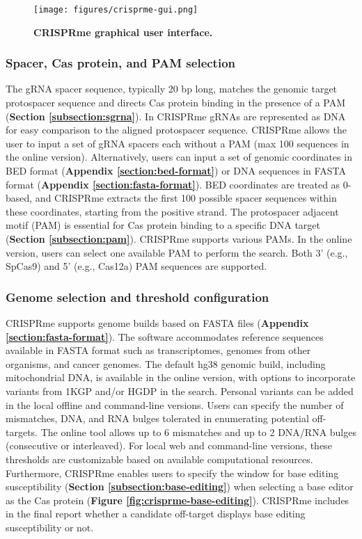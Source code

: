 \documentclass[a4paper, titlepage, openright]{book}
\newcommand{\crisprme}{CRISPRme\xspace}
\begin{document}
\begin{figure}[!]
	\centering
	\texttt{[image: figures/crisprme-gui.png]}
	\caption[\crisprme graphical user interface]{\textbf{\crisprme graphical user interface.}}
	\label{fig:crisprme-gui}
\end{figure}

\subsubsection{Spacer, Cas protein, and PAM selection}
The gRNA spacer sequence, typically 20 bp long, matches the genomic target protospacer sequence and directs Cas protein binding in the presence of a PAM (\textbf{Section \ref{subsection:sgrna}}). In \crisprme gRNAs are represented as DNA for easy comparison to the aligned protospacer sequence. \crisprme allows the user to input a set of gRNA spacers each without a PAM (max 100 sequences in the online version). Alternatively, users can input a set of genomic coordinates in BED format (\textbf{Appendix \ref{section:bed-format}}) or DNA sequences in FASTA format (\textbf{Appendix \ref{section:fasta-format}}). BED coordinates are treated as 0-based, and \crisprme extracts the first 100 possible spacer sequences within these coordinates, starting from the positive strand. The protospacer adjacent motif (PAM) is essential for Cas protein binding to a specific DNA target (\textbf{Section \ref{subsection:pam}}). \crisprme supports various PAMs. In the online version, users can select one available PAM to perform the search. Both 3’ (e.g., SpCas9) and 5’ (e.g., Cas12a) PAM sequences are supported.

\subsubsection{Genome selection and threshold configuration}
\crisprme supports genome builds based on FASTA files (\textbf{Appendix \ref{section:fasta-format}}). The software accommodates reference sequences available in FASTA format such as transcriptomes, genomes from other organisms, and cancer genomes. The default hg38 genomic build, including mitochondrial DNA, is available in the online version, with options to incorporate variants from 1KGP and/or HGDP in the search. Personal variants can be added in the local offline and command-line versions. Users can specify the number of mismatches, DNA, and RNA bulges tolerated in enumerating potential off-targets. The online tool allows up to 6 mismatches and up to 2 DNA/RNA bulges (consecutive or interleaved). For local web and command-line versions, these thresholds are customizable based on available computational resources. Furthermore, \crisprme enables users to specify the window for base editing susceptibility (\textbf{Section \ref{subsection:base-editing}}) when selecting a base editor as the Cas protein (\textbf{Figure \ref{fig:crisprme-base-editing}}). \crisprme includes in the final report whether a candidate off-target displays base editing susceptibility or not. 
\end{document}
